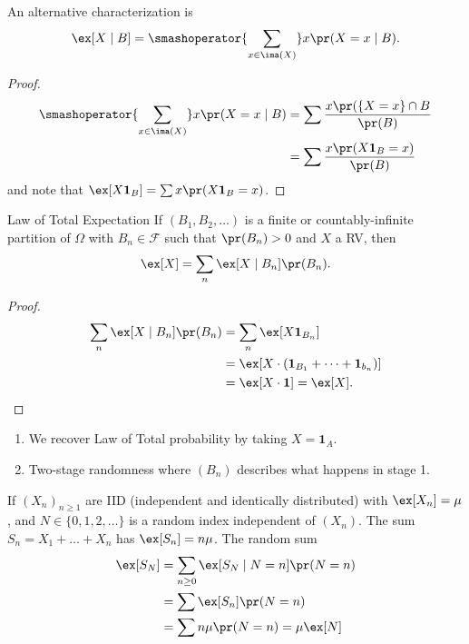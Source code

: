 \begin{remark}
    An alternative characterization is
    \[
        \ex[X \mid B] = \smashoperator{\sum_{x \in \ima(X)}} x \pr(X = x \mid B).
    \]
    \begin{proof}
        \begin{align*}
            \smashoperator{\sum_{x \in \ima(X)}} x \pr(X = x \mid B) &= \sum \frac{x \pr(\{X = x\}\cap B}{\pr(B)}\\
            &= \sum \frac{x\pr(X\mathbf{1}_B=x)}{\pr(B)}
        \end{align*}
        and note that \(\ex[X \textbf{1}_B] = \sum x \pr(X \textbf{1}_B = x)\).
    \end{proof}
\end{remark}
\begin{theorem}{Law of Total Expectation}{}
    If \((B_1, B_2, \dots)\) is a finite or countably-infinite partition of \(\Omega\) with \(B_n \in \mathcal{F}\) such that \(\pr(B_n) > 0\) and \(X\) a RV, then
    \[
        \ex[X] = \sum_n \ex[X \mid B_n] \pr(B_n).
    \]
\end{theorem}
\begin{proof}
    \begin{align*}
        \sum_n \ex[X \mid B_n] \pr(B_n) &= \sum_n \ex[X \textbf{1}_{B_n}]\\
        &= \ex[X \cdot(\textbf{1}_{B_1} + \dots + \textbf{1}_{b_n})]\\
        &= \ex[X \cdot \textbf{1}] = \ex[X].
    \end{align*}
\end{proof}
\begin{remark}
    \begin{enumerate}
        \item We recover Law of Total probability by taking \(X = \textbf{1}_A\).
        \item Two-stage randomness where \((B_n)\) describes what happens in stage 1.
    \end{enumerate}
\end{remark}
\begin{example}
    If \((X_n)_{n \geq 1}\) are IID (independent and identically distributed) with \(\ex[X_n] = \mu\), and \(N \in \{0, 1, 2, \dots\}\) is a random index independent of \((X_n)\). The sum \(S_n = X_1 + \dots + X_n\) has \(\ex[S_n] = n\mu\). The random sum
    \begin{align*}
        \ex[S_N] &= \sum_{n \geq 0} \ex[S_N \mid N = n] \pr(N = n)\\
        &= \sum \ex[S_n] \pr(N = n)\\
        &= \sum n\mu\pr(N = n) = \mu\ex[N]
    \end{align*}
\end{example}